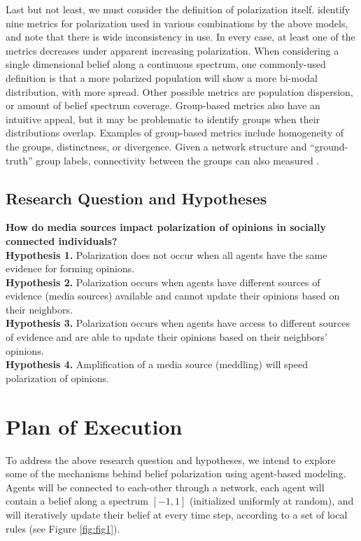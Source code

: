 \documentclass{article}
\begin{document}
Last but not least, we must consider the definition of polarization itself. \citet{bramson2017} identify nine metrics for polarization used in various combinations by the above models, and note that there is wide inconsistency in use. In every case, at least one of the metrics decreases under apparent increasing polarization. 
When considering a single dimensional belief along a continuous spectrum, one commonly-used definition is that a more polarized population will show a more bi-modal distribution, with more spread. Other possible metrics are population dispersion, or amount of belief spectrum coverage. 
Group-based metrics also have an intuitive appeal, but it may be problematic to identify groups when their distributions overlap. Examples of group-based metrics include homogeneity of the groups, distinctness, or divergence. Given a network structure and ``ground-truth'' group labels, connectivity between the groups can also measured \citep{bramson2017}. 

\subsection{Research Question and Hypotheses}
\textbf{How do media sources impact polarization of opinions in socially connected individuals?} \hfill\break
\\
\textbf{Hypothesis 1.}  Polarization does not occur when all agents have the same evidence for forming opinions.\\
\textbf{Hypothesis 2.} Polarization occurs when agents have different sources of evidence (media sources) available and cannot update their opinions based on their neighbors. \\
\textbf{Hypothesis 3.} Polarization occurs when agents have access to different sources of evidence and are able to update their opinions based on their neighbors' opinions.\\ 
\textbf{Hypothesis 4.} Amplification of a media source (meddling) will speed polarization of opinions.

\section{Plan of Execution}

To address the above research question and hypotheses, we intend to explore some of the mechanisms behind belief polarization using agent-based modeling. Agents will be connected to each-other through a network, each agent will contain a belief along a spectrum $[-1, 1]$ (initialized uniformly at random), and will iteratively update their belief at every time step, according to a set of local rules (see Figure \ref{fig:fig1}). 
\end{document}
